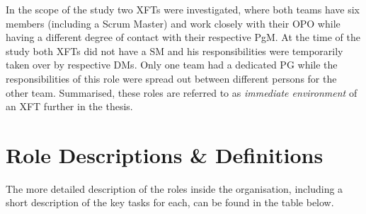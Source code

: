 In the scope of the study two \acp{XFT} were investigated, where both teams have six members (including a Scrum Master) and work closely with their \ac{OPO} while having a different degree of contact with their respective \ac{PgM}. At the time of the study both \acp{XFT} did not have a \ac{SM} and his responsibilities were temporarily taken over by respective \acp{DM}. Only one team had a dedicated \ac{PG} while the responsibilities of this role were spread out between different persons for the other team. Summarised, these roles are referred to as \emph{immediate environment} of an \ac{XFT} further in the thesis.

\section{Role Descriptions \& Definitions}

The more detailed description of the roles inside the organisation, including a short description of the key tasks for each, can be found in the table below. %

